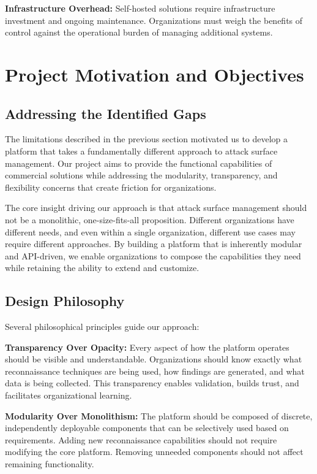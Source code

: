 \documentclass[a4paper,12pt]{report}
\begin{document}
\textbf{Infrastructure Overhead:} Self-hosted solutions require infrastructure investment and ongoing maintenance. Organizations must weigh the benefits of control against the operational burden of managing additional systems.\hfill \break

\section{Project Motivation and Objectives}

\subsection{Addressing the Identified Gaps}

The limitations described in the previous section motivated us to develop a platform that takes a fundamentally different approach to attack surface management. Our project aims to provide the functional capabilities of commercial solutions while addressing the modularity, transparency, and flexibility concerns that create friction for organizations.\hfill \break

The core insight driving our approach is that attack surface management should not be a monolithic, one-size-fits-all proposition. Different organizations have different needs, and even within a single organization, different use cases may require different approaches. By building a platform that is inherently modular and API-driven, we enable organizations to compose the capabilities they need while retaining the ability to extend and customize.\hfill \break

\subsection{Design Philosophy}

Several philosophical principles guide our approach:\hfill \break

\textbf{Transparency Over Opacity:} Every aspect of how the platform operates should be visible and understandable. Organizations should know exactly what reconnaissance techniques are being used, how findings are generated, and what data is being collected. This transparency enables validation, builds trust, and facilitates organizational learning.\hfill \break

\textbf{Modularity Over Monolithism:} The platform should be composed of discrete, independently deployable components that can be selectively used based on requirements. Adding new reconnaissance capabilities should not require modifying the core platform. Removing unneeded components should not affect remaining functionality.\hfill \break
\end{document}
